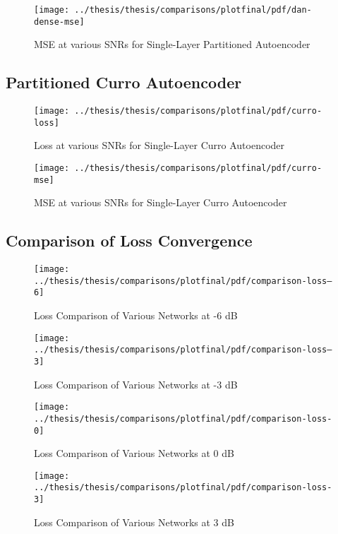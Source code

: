 \begin{figure}[!ht]
\centering
\texttt{[image: ../thesis/thesis/comparisons/plotfinal/pdf/dan-dense-mse]}
\caption{MSE at various SNRs for Single-Layer Partitioned Autoencoder\cite{stow}}
\label{fig:dan-mse}
\end{figure}

\subsection{Partitioned Curro Autoencoder}

\begin{figure}[!ht]
\centering
\texttt{[image: ../thesis/thesis/comparisons/plotfinal/pdf/curro-loss]}
\caption{Loss at various SNRs for Single-Layer Curro Autoencoder}
\end{figure}

\begin{figure}[!ht]
\centering
\texttt{[image: ../thesis/thesis/comparisons/plotfinal/pdf/curro-mse]}
\caption{MSE at various SNRs for Single-Layer Curro Autoencoder}
\end{figure}

\subsection{Comparison of Loss Convergence}

\begin{figure}[!ht]
\centering
\texttt{[image: ../thesis/thesis/comparisons/plotfinal/pdf/comparison-loss--6]}
\caption{Loss Comparison of Various Networks at -6 dB}
\end{figure}

\begin{figure}[!ht]
\centering
\texttt{[image: ../thesis/thesis/comparisons/plotfinal/pdf/comparison-loss--3]}
\caption{Loss Comparison of Various Networks at -3 dB}
\end{figure}

\begin{figure}[!ht]
\centering
\texttt{[image: ../thesis/thesis/comparisons/plotfinal/pdf/comparison-loss-0]}
\caption{Loss Comparison of Various Networks at 0 dB}
\end{figure}

\begin{figure}[!ht]
\centering
\texttt{[image: ../thesis/thesis/comparisons/plotfinal/pdf/comparison-loss-3]}
\caption{Loss Comparison of Various Networks at 3 dB}
\end{figure}

